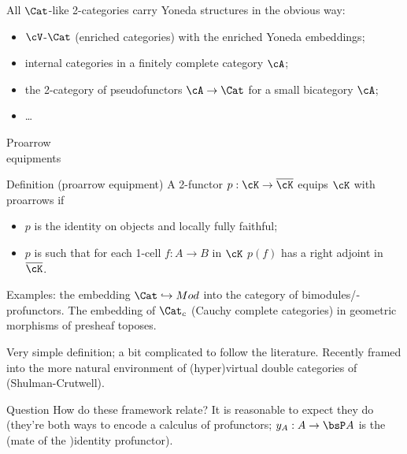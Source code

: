 \documentclass{beamer}
\begin{document}
\begin{frame}
	All $\Cat$-like 2-categories carry Yoneda structures in the obvious way:
	\begin{itemize}
		\item $\cV$-$\Cat$ (enriched categories) with the enriched Yoneda embeddings;
		\item internal categories in a finitely complete category $\cA$;
		\item the 2-category of pseudofunctors $\cA\to \Cat$ for a small bicategory $\cA$;
		\item \dots
	\end{itemize}
\end{frame}

\begin{frame}
	\Huge\centering Proarrow \\ equipments
\end{frame}
\begin{frame}
	\begin{block}{Definition (proarrow equipment)}
		A 2-functor $p : \cK \to \overline{\cK}$ \alert{equips $\cK$ with proarrows} if
		\begin{itemize}
			\item $p$ is the identity on objects and locally fully faithful;
			\item $p$ is such that for each 1-cell $f : A\to B$ in $\cK$ $p(f)$ has a right adjoint in $\overline{\cK}$.
		\end{itemize}
	\end{block}
	Examples: the embedding $\Cat \hookrightarrow Mod$ into the category of bimodules\fshyp{}profunctors. The embedding of $\Cat_c$ (Cauchy complete categories) in geometric morphisms of presheaf toposes.

	\bigskip{}
	\begin{block}{}
		Very simple definition; a bit complicated to follow the literature. Recently framed into the more natural environment of \alert{(hyper)virtual double categories} of (Shulman-Crutwell).
	\end{block}
\end{frame}
\begin{frame}
	\begin{block}{Question}
		How do these framework relate? It is reasonable to expect they do (they're both ways to encode a calculus of profunctors; $y_A : A\to \bsP A$ is the \alert{(mate of the )identity profunctor}).
	\end{block}
\end{frame}
\end{document}

